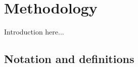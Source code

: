 \chapter{Methodology} \label{chap:method}

Introduction here...

\section{Notation and definitions} \label{notation}
